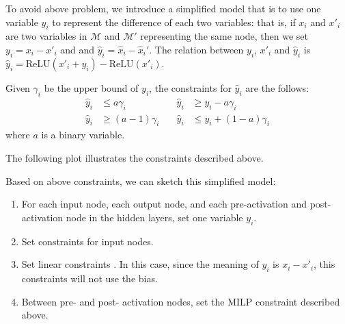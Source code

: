 \documentclass[letterpaper]{article} %
\newcommand{\ReLU}{\mathrm{ReLU}}
\begin{document}
	To avoid above problem, we introduce a simplified model that is to use one variable $y_i$ to represent the difference of each two variables: that is, if $x_i$ and $x'_i$ are two variables in $\mathcal{M}$ and $\mathcal{M}'$ representing the same node, then we set $y_i=x_i-x'_i$ and and $\hat{y}_i=\hat{x}_i-\hat{x}_i'$. The relation between $y_i$, $x'_i$ and $\hat{y}_i$ is $\hat{y}_i = \ReLU(x'_i+y_i)-\ReLU(x'_i).$ 
	
	Given  $\gamma_i$ be the upper bound of $y_i$, the constraints for $\hat{y}_i$ are the follows:\begin{align*}
		\hat{y}_i &\leq a \gamma_i               &\quad \hat{y}_i &\geq y_i - a \gamma_i \\
		\hat{y}_i &\geq (a-1) \gamma_i           &\quad \hat{y}_i &\leq y_i + (1-a) \gamma_i
	\end{align*} where $a$ is a binary variable.
	
	
	The following plot illustrates the constraints described above.
	
	\hspace*{10ex}
	
	Based on above constraints, we can sketch this simplified model:
	\begin{enumerate}
		\item For each input node, each output node, and each pre-activation and post-activation node in the hidden layers,  set one variable $y_i$. 
		\item Set constraints for input nodes.
		\item Set linear constraints . In this case, since the meaning of $y_i$ is $x_i-x'_i$, this constraints will not use the bias.
		\item Between pre- and post- activation nodes, set the MILP constraint described above.
	\end{enumerate}
	
\end{document}
